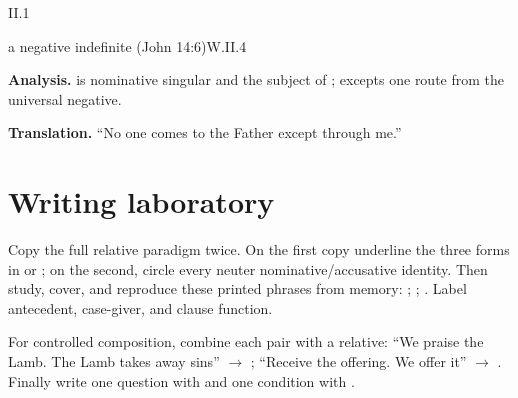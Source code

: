 \begin{courseunit}{II.1}
\begin{workedexample}{a negative indefinite (John 14:6)}{W.II.4}

\textbf{Analysis.}   is nominative singular and the subject of ;
 excepts one route from the universal negative.

\textbf{Translation.}  ``No one comes to the Father except through me.''
\end{workedexample}

\section{Writing laboratory}

Copy the full relative paradigm twice.  On the first copy underline the three forms in
 or ; on the second, circle every neuter nominative/accusative identity.
Then study, cover, and reproduce these printed phrases from memory: ; ; .
Label antecedent, case-giver, and clause function.

For controlled composition, combine each pair with a relative: ``We praise the Lamb.  The
Lamb takes away sins'' $\rightarrow$ ; ``Receive the
offering.  We offer it'' $\rightarrow$ .  Finally
write one question with  and one condition with .



\end{courseunit}

